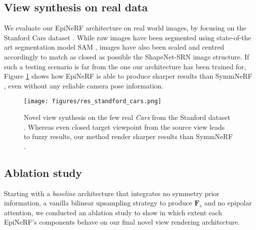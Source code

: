 \subsection{View synthesis on real data}
We evaluate our EpiNeRF architecture on real world images, by focusing on the Stanford Cars dataset \cite{krause20133d}. While raw images have been segmented using state-of-the art segmentation model SAM \cite{kirillov2023segment}, images have also been scaled and centred accordingly to match as closed as possible the ShapeNet-SRN image structure. If such a testing scenario is far from the one our architecture has been trained for, Figure \ref{fig:res_Stanfordcar} shows how EpiNeRF is able to produce sharper results than SymmNeRF \cite{symmnerf}, even without any reliable camera pose information.

\begin{figure}[htb!]
    \center
  \texttt{[image: figures/res\_standford\_cars.png]}
  \caption{Novel view synthesis on the few real \textit{Cars} from the Stanford dataset \cite{krause20133d}. Whereas even closed target viewpoint from the source view leads to fuzzy results, our method render sharper results than SymmNeRF \cite{symmnerf}. }
  \label{fig:res_Stanfordcar}
\end{figure}



\subsection{Ablation study}
Starting with a \textit{baseline} architecture that integrates no symmetry prior information, a vanilla bilinear upsampling strategy to produce $\mathbf{F}_{s}$ and no epipolar attention, we conducted an ablation study to show in which extent each EpiNeRF's components behave on our final novel view rendering architecture. 

